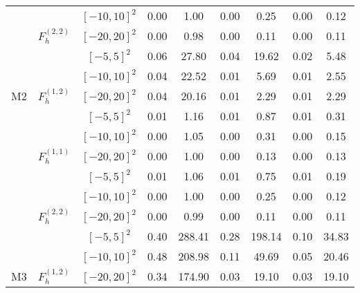 \documentclass[12pt]{article}
\begin{document}
\begin{table}
\begin{tabular}[t]{ccccccccc}
		&  & $[-10,10]^2$ & 0.00 & 1.00 & 0.00 & 0.25 & 0.00 & 0.12\\
		
		& \multirow{-3}{*}{$F^{(2,2)}_h$} & $[-20,20]^2$ & 0.00 & 0.98 & 0.00 & 0.11 & 0.00 & 0.11\\
		\cmidrule{2-9}
		&  & $[-5,5]^2$ & 0.06 & 27.80 & 0.04 & 19.62 & 0.02 & 5.48\\
		
		&  & $[-10,10]^2$ & 0.04 & 22.52 & 0.01 & 5.69 & 0.01 & 2.55\\
		
		\multirow{-9}{*}[1\dimexpr\aboverulesep+\belowrulesep+\cmidrulewidth]{M2} & \multirow{-3}{*}{$F^{(1,2)}_h$} & $[-20,20]^2$ & 0.04 & 20.16 & 0.01 & 2.29 & 0.01 & 2.29\\
		\cmidrule{1-9}
		&  & $[-5,5]^2$ & 0.01 & 1.16 & 0.01 & 0.87 & 0.01 & 0.31\\
		
		&  & $[-10,10]^2$ & 0.00 & 1.05 & 0.00 & 0.31 & 0.00 & 0.15\\
		
		& \multirow{-3}{*}{$F^{(1,1)}_h$} & $[-20,20]^2$ & 0.00 & 1.00 & 0.00 & 0.13 & 0.00 & 0.13\\
		\cmidrule{2-9}
		&  & $[-5,5]^2$ & 0.01 & 1.06 & 0.01 & 0.75 & 0.01 & 0.19\\
		
		&  & $[-10,10]^2$ & 0.00 & 1.00 & 0.00 & 0.25 & 0.00 & 0.12\\
		
		& \multirow{-3}{*}{$F^{(2,2)}_h$} & $[-20,20]^2$ & 0.00 & 0.99 & 0.00 & 0.11 & 0.00 & 0.11\\
		\cmidrule{2-9}
		&  & $[-5,5]^2$ & 0.40 & 288.41 & 0.28 & 198.14 & 0.10 & 34.83\\
		
		&  & $[-10,10]^2$ & 0.48 & 208.98 & 0.11 & 49.69 & 0.05 & 20.46\\
		
		\multirow{-9}{*}[1\dimexpr\aboverulesep+\belowrulesep+\cmidrulewidth]{M3} & \multirow{-3}{*}{$F^{(1,2)}_h$} & $[-20,20]^2$ & 0.34 & 174.90 & 0.03 & 19.10 & 0.03 & 19.10\\
		\bottomrule
	\end{tabular}
\end{table}
\end{document}
